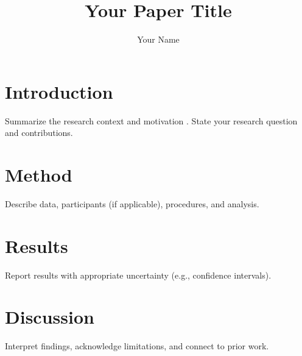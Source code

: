 \documentclass[man]{apa7}
\title{Your Paper Title}
\author{Your Name}
\affiliation{Your Institution}
\begin{document}
\maketitle

\section{Introduction}
Summarize the research context and motivation \parencite{smith2023}. State your research question and contributions.

\section{Method}
Describe data, participants (if applicable), procedures, and analysis.

\section{Results}
Report results with appropriate uncertainty (e.g., confidence intervals).

\section{Discussion}
Interpret findings, acknowledge limitations, and connect to prior work.

\printbibliography
\end{document}
